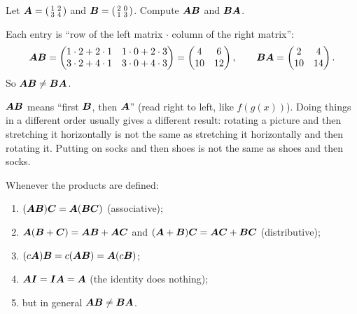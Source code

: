 \begin{example}\label{ex:not-commutative}
Let $\bm{A} = \left(\begin{smallmatrix} 1 & 2\\ 3 & 4\end{smallmatrix}\right)$ and
$\bm{B} = \left(\begin{smallmatrix} 2 & 0\\ 1 & 3\end{smallmatrix}\right)$. Compute
$\bm{A}\bm{B}$ and $\bm{B}\bm{A}$.

\sol Each entry is ``row of the left matrix $\cdot$ column of the right
matrix'':
\[
  \bm{A}\bm{B} = \begin{pmatrix} 1\cdot2 + 2\cdot1 & 1\cdot0 + 2\cdot3\\
  3\cdot2 + 4\cdot1 & 3\cdot0 + 4\cdot3\end{pmatrix}
  = \begin{pmatrix} 4 & 6\\ 10 & 12\end{pmatrix},
  \qquad
  \bm{B}\bm{A} = \begin{pmatrix} 2 & 4\\ 10 & 14\end{pmatrix}.
\]
So $\bm{A}\bm{B} \neq \bm{B}\bm{A}$.
\end{example}

\begin{intuition}
$\bm{A}\bm{B}$ means ``first $\bm{B}$, then $\bm{A}$'' (read right to left, like
$f(g(x))$). Doing things in a different order usually gives a different
result: rotating a picture and then stretching it horizontally is not the same
as stretching it horizontally and then rotating it. Putting on socks and then
shoes is not the same as shoes and then socks.
\end{intuition}

\begin{theorem}\label{thm:matrix-mult-rules}
Whenever the products are defined:
\begin{enumerate}
  \item $(\bm{A}\bm{B})\bm{C} = \bm{A}(\bm{B}\bm{C})$ (associative);
  \item $\bm{A}(\bm{B} + \bm{C}) = \bm{A}\bm{B} + \bm{A}\bm{C}$ and $(\bm{A} + \bm{B})\bm{C} = \bm{A}\bm{C} + \bm{B}\bm{C}$
    (distributive);
  \item $(c\bm{A})\bm{B} = c(\bm{A}\bm{B}) = \bm{A}(c\bm{B})$;
  \item $\bm{A}\bm{I} = \bm{I}\bm{A} = \bm{A}$ (the identity does nothing);
  \item but in general $\bm{A}\bm{B} \neq \bm{B}\bm{A}$.
\end{enumerate}
\end{theorem}

